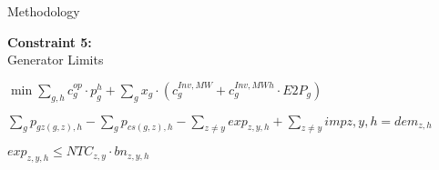 \documentclass[aspectratio=169]{beamer}
\begin{document}
\begin{frame}{Methodology}
\begin{minipage}[t]{0.2\textwidth}
        \vspace{-0.55cm}
        \begin{coloredblockdark}[blue][][][][2.35cm][][0ex][0ex]
                \begin{minipage}[c][2.35cm][c]{0.4\textwidth}
                    \centering
                    \Large{}
                \end{minipage}%
                \hfill
                \begin{minipage}[c][2.35cm][c]{0.55\textwidth}
                    \centering
                    \tiny\textbf{Constraint 5:}\\ 
                    Generator Limits
                \end{minipage}%
                \hspace{0.05\textwidth}
        \end{coloredblockdark}
    \end{minipage}
    \hfill
    \begin{minipage}[t]{0.78\textwidth}
        \begin{coloredblock}[blue][][][][2.35cm][][0ex][0ex]
            \vspace{0.35cm}
            \begin{center}
                \small$\min \sum_{g,h} c_{g}^{op} \cdot p_g^{h} + \sum_{g} x_g \cdot (c_{g}^{Inv,MW} + c_{g}^{Inv,MWh} \cdot E2P_g)$
            \end{center}
        \end{coloredblock}
        \vspace{-0.55cm}
        \begin{coloredblock}[blue][][][][2.35cm][][0ex][0ex]
            \vspace{0.35cm}
            \begin{center}
                \small$\sum_{g} p_{gz(g,z),h} - \sum_{g} p_{cs(g,z),h} - \sum_{z \neq y} exp_{z,y,h} + \sum_{z \neq y} imp{z,y,h} = dem_{z,h}$
            \end{center}
        \end{coloredblock}
        \vspace{-0.55cm}
        \begin{coloredblock}[blue][][][][2.35cm][][0ex][0ex]
            \vspace{0.35cm}
            \begin{center}
                \small$exp_{z,y,h} \leq NTC_{z,y} \cdot bn_{z,y,h}$
            \end{center}
        \end{coloredblock}

\end{minipage}
\end{frame}
\end{document}
